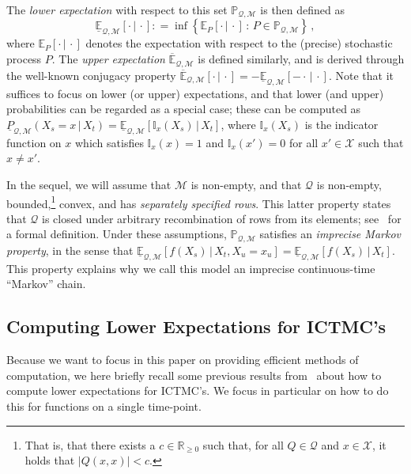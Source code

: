 \documentclass[twoside,11pt]{article}
\newcommand{\reals}{\mathbb{R}}
\newcommand{\realsnonneg}{\reals_{\geq 0}}
\newcommand{\states}{\mathcal{X}}
\newcommand{\lexp}{\underline{\mathbb{E}}_{\rateset,\mathcal{M}}}
\newcommand{\uexp}{\overline{\mathbb{E}}_{\rateset,\mathcal{M}}}
\newcommand{\gambles}{\mathcal{L}}
\newcommand{\gamblesX}{\gambles(\states)}
\newcommand{\ind}[1]{\mathbb{I}_{#1}}
\newcommand{\rateset}{\mathcal{Q}}
\newcommand{\abs}[1]{\left\vert #1 \right\vert}
\newcommand{\coloneqq}{:\!=}
\begin{document}
The \emph{lower expectation} with respect to this set $\mathbb{P}_{\rateset,\mathcal{M}}$ is then defined as
\begin{equation*}
\underline{\mathbb{E}}_{\rateset,\mathcal{M}}[\cdot\,\vert\,\cdot] \coloneqq \inf\left\{ \mathbb{E}_P[\cdot\,\vert\,\cdot]\,:\, P\in\mathbb{P}_{\rateset,\mathcal{M}} \right\}\,,
\end{equation*}
where $\mathbb{E}_P[\cdot\,\vert\,\cdot]$ denotes the expectation with respect to the (precise) stochastic process $P$. The \emph{upper expectation} $\uexp$ is defined similarly, and is derived through the well-known conjugacy property $\uexp[\cdot\,\vert\,\cdot] = -\lexp[-\cdot\,\vert\,\cdot]$. Note that it suffices to focus on lower (or upper) expectations, and that lower (and upper) probabilities can be regarded as a special case; these can be computed as $\underline{P}_{\rateset,\mathcal{M}}(X_s=x\,\vert\,X_t) = \lexp[\ind{x}(X_s)\,\vert\,X_t]$, where $\ind{x}(X_s)$ is the indicator function on $x$ which satisfies $\ind{x}(x)=1$ and $\ind{x}(x')=0$ for all $x'\in\states$ such that $x\neq x'$.

In the sequel, we will assume that $\mathcal{M}$ is non-empty, and that $\rateset$ is non-empty, bounded,\footnote{That is, that there exists a $c\in\realsnonneg$ such that, for all $Q\in\rateset$ and $x\in\states$, it holds that $\abs{Q(x,x)}<c$.} convex, and has \emph{separately specified rows}. This latter property states that $\rateset$ is closed under arbitrary recombination of rows from its elements; see~\citep[Definition 24]{krak2016ictmc} for a formal definition. %
Under these assumptions, $\mathbb{P}_{\rateset,\mathcal{M}}$ satisfies an \emph{imprecise Markov property}, in the sense that $\lexp[f(X_s)\,\vert\,X_t,X_u=x_u]=\lexp[f(X_s)\,\vert\,X_t]$. This property explains why we call this model an imprecise continuous-time ``Markov'' chain.

\subsection{Computing Lower Expectations for ICTMC's}\label{subsec:ICTMC_computations}

Because we want to focus in this paper on providing efficient methods of computation, we here briefly recall some previous results from~\citet{krak2016ictmc} about how to compute lower expectations for ICTMC's. We focus in particular on how to do this for functions on a single time-point. %
\end{document}

